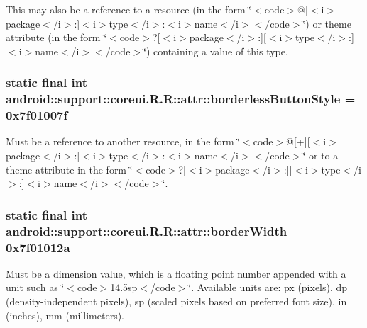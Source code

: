 This may also be a reference to a resource (in the form \char`\"{}$<$code$>$@\mbox{[}$<$i$>$package$<$/i$>$:\mbox{]}$<$i$>$type$<$/i$>$:$<$i$>$name$<$/i$>$$<$/code$>$\char`\"{}) or theme attribute (in the form \char`\"{}$<$code$>$?\mbox{[}$<$i$>$package$<$/i$>$:\mbox{]}\mbox{[}$<$i$>$type$<$/i$>$:\mbox{]}$<$i$>$name$<$/i$>$$<$/code$>$\char`\"{}) containing a value of this type. \hypertarget{classandroid_1_1support_1_1coreui_1_1_r_1_1attr_a85d57e68f9b0d35b73d14a4dbdcd7f4}{
\subsubsection[{borderlessButtonStyle}]{\setlength{\rightskip}{0pt plus 5cm}static final int android::support::coreui.R.R::attr::borderlessButtonStyle = 0x7f01007f}}
\label{classandroid_1_1support_1_1coreui_1_1_r_1_1attr_a85d57e68f9b0d35b73d14a4dbdcd7f4}


Must be a reference to another resource, in the form \char`\"{}$<$code$>$@\mbox{[}+\mbox{]}\mbox{[}$<$i$>$package$<$/i$>$:\mbox{]}$<$i$>$type$<$/i$>$:$<$i$>$name$<$/i$>$$<$/code$>$\char`\"{} or to a theme attribute in the form \char`\"{}$<$code$>$?\mbox{[}$<$i$>$package$<$/i$>$:\mbox{]}\mbox{[}$<$i$>$type$<$/i$>$:\mbox{]}$<$i$>$name$<$/i$>$$<$/code$>$\char`\"{}. \hypertarget{classandroid_1_1support_1_1coreui_1_1_r_1_1attr_4680b66c6749f6447c8e5036dd670e78}{
\subsubsection[{borderWidth}]{\setlength{\rightskip}{0pt plus 5cm}static final int android::support::coreui.R.R::attr::borderWidth = 0x7f01012a}}
\label{classandroid_1_1support_1_1coreui_1_1_r_1_1attr_4680b66c6749f6447c8e5036dd670e78}


Must be a dimension value, which is a floating point number appended with a unit such as \char`\"{}$<$code$>$14.5sp$<$/code$>$\char`\"{}. Available units are: px (pixels), dp (density-independent pixels), sp (scaled pixels based on preferred font size), in (inches), mm (millimeters). 

